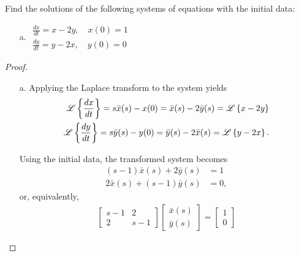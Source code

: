 \begin{problem}{4.3}
  Find the solutions of the following systems of equations with the initial data:
  \begin{enumerate}
    \item[a.]
      $
      \begin{array}{ll}
        \frac{dx}{dt} = x - 2y, \quad x(0) = 1 \\
        \frac{dy}{dt} = y - 2x, \quad y(0) = 0
      \end{array}
      $

  \end{enumerate}
\end{problem}

\begin{proof}
  \begin{enumerate}
    \item[a.] Applying the Laplace transform to the system yields
      \begin{align*}
        \mathscr{L}\left\{ {\frac{dx}{dt}} \right\} = s\bar{x}(s) - x(0) = \bar{x}(s) - 2 \bar{y}(s) = \mathscr{L}\left\{ {x - 2y} \right\} \\
        \mathscr{L}\left\{ {\frac{dy}{dt}} \right\} = s\bar{y}(s) - y(0) = \bar{y}(s) - 2 \bar{x}(s) = \mathscr{L}\left\{ {y - 2x} \right\}.
      \end{align*}

      Using the initial data, the transformed system becomes
      \begin{align*}
        (s-1)\bar{x}(s) + 2 \bar{y}(s) &= 1\\
        2\bar{x}(s) + (s-1) \bar{y}(s) &= 0,
      \end{align*}
      or, equivalently,
      \begin{align*}
        \begin{bmatrix}
          s-1 & 2 \\
          2 & s-1
        \end{bmatrix}
        \begin{bmatrix}
          \bar{x}(s) \\
          \bar{y}(s)
        \end{bmatrix}
        =
        \begin{bmatrix}
          1 \\
          0
        \end{bmatrix}
      \end{align*}


\end{enumerate}
\end{proof}
